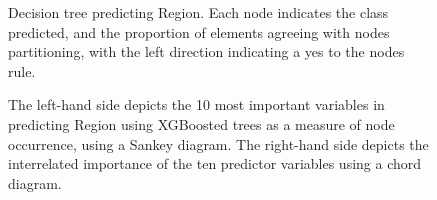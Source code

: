 \documentclass[review,12pt,authoryear]{elsarticle}
\begin{document}
\begin{linenumbers}
\begin{figure}
 \caption{Decision tree predicting Region. Each node indicates the class predicted, and the proportion of elements agreeing with nodes partitioning, with the left direction indicating a yes to the nodes rule.}\label{fig:region_tree}
\end{figure}

\begin{figure}
 \caption{The left-hand side depicts the 10 most important variables in predicting Region using XGBoosted trees as a measure of node occurrence, using a Sankey diagram. The right-hand side depicts the interrelated importance of the ten predictor variables using a chord diagram.}\label{fig:region_sankey}
\end{figure}


\end{linenumbers}
\end{document}
